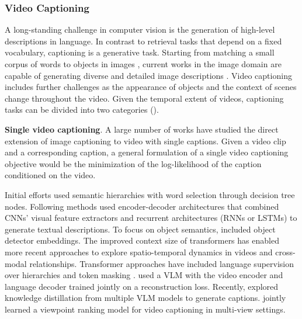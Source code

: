 \subsubsection{Video Captioning} 
\label{sec:recognition::language:::vc}

A long-standing challenge in computer vision is the generation of high-level descriptions in language. In contrast to retrieval tasks that depend on a fixed vocabulary, captioning is a generative task. Starting from matching a small corpus of words to objects in images , current works in the image domain are capable of generating diverse and detailed image descriptions . Video captioning includes further challenges as the appearance of objects and the context of scenes change throughout the video. Given the temporal extent of videos, captioning tasks can be divided into two categories ().

\noindent
\textbf{Single video captioning}. A large number of works have studied the direct extension of image captioning to video with single captions.  
Given a video clip and a corresponding caption, a general formulation of a single video captioning objective would be the minimization of the log-likelihood of the caption conditioned on the video.


Initial efforts  used semantic hierarchies with word selection through decision tree nodes. Following methods  used encoder-decoder architectures that combined CNNs' visual feature extractors and recurrent architectures (RNNs or LSTMs) to generate textual descriptions. To focus on object semantics,  included object detector embeddings. The improved context size of transformers has enabled more recent approaches to explore spatio-temporal dynamics in videos and cross-modal relationships. Transformer approaches have included language supervision over hierarchies  and token masking .  used a VLM with the video encoder and language decoder trained jointly on a reconstruction loss. Recently,  explored knowledge distillation from multiple VLM models to generate captions.  jointly learned a viewpoint ranking model for video captioning in multi-view settings.

